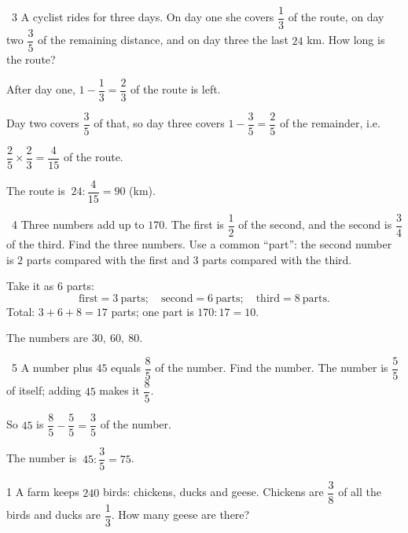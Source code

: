 \gap
\begin{exbox}{\ExWord\ 3}
A cyclist rides for three days. On day one she covers $\dfrac13$ of the route, on day two $\dfrac35$ of the remaining distance, and on day three the last $24$ km. How long is the route?
\guide
\begin{barfigC}
\end{barfigC}
After day one, $1-\dfrac13=\dfrac23$ of the route is left.\par
Day two covers $\dfrac35$ of that, so day three covers $1-\dfrac35=\dfrac25$ of the remainder, i.e.\par $\dfrac25\times\dfrac23=\dfrac4{15}$ of the route.\par
The route is $\ 24:\dfrac4{15}=90$ (km).
\end{exbox}
\gap
\begin{exbox}{\ExWord\ 4}
Three numbers add up to $170$. The first is $\dfrac12$ of the second, and the second is $\dfrac34$ of the third. Find the three numbers.
\guide
Use a common ``part'': the second number is $2$ parts compared with the first and $3$ parts compared with the third.\par Take it as $6$ parts:
\[\text{first}=3\ \text{parts};\quad\text{second}=6\ \text{parts};\quad\text{third}=8\ \text{parts}.\]
Total: $3+6+8=17$ parts; one part is $170:17=10$.\par
The numbers are $30,\ 60,\ 80$.
\end{exbox}
\gap
\begin{exbox}{\ExWord\ 5}
A number plus $45$ equals $\dfrac85$ of the number. Find the number.
\guide
The number is $\dfrac55$ of itself; adding $45$ makes it $\dfrac85$.\par So $45$ is $\dfrac85-\dfrac55=\dfrac35$ of the number.\par
The number is $\ 45:\dfrac35=75$.
\end{exbox}
\begin{probbox}{1}{\relax}
A farm keeps $240$ birds: chickens, ducks and geese. Chickens are $\dfrac38$ of all the birds and ducks are $\dfrac13$. How many geese are there?
\end{probbox}

